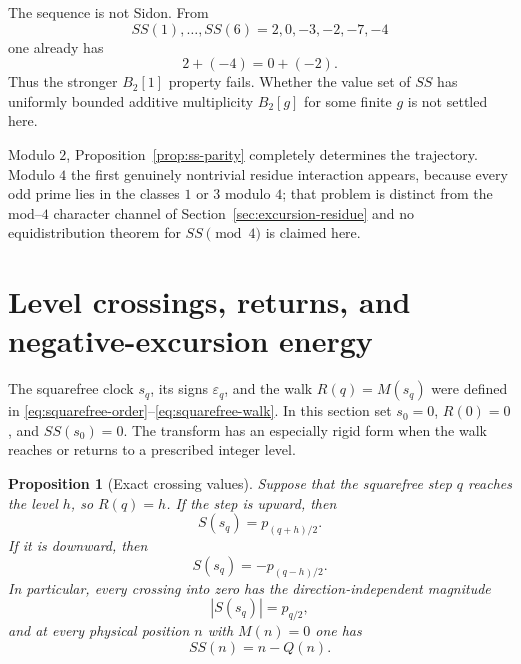 \documentclass[11pt]{amsart}
\numberwithin{equation}{section}
\theoremstyle{plain}
\newtheorem{proposition}[theorem]{Proposition}
\theoremstyle{definition}
\theoremstyle{remark}
\begin{document}
The sequence is not Sidon.  From
\begin{equation}
\label{eq:first-SS-values-v9}
SS(1),\ldots,SS(6)=2,0,-3,-2,-7,-4
\end{equation}
one already has
\begin{equation}
\label{eq:ss-not-Sidon-witness}
2+(-4)=0+(-2).
\end{equation}
Thus the stronger $B_2[1]$ property fails.  Whether the value set of $SS$ has
uniformly bounded additive multiplicity $B_2[g]$ for some finite $g$ is not
settled here.

Modulo $2$, Proposition~\ref{prop:ss-parity} completely determines the
trajectory.  Modulo $4$ the first genuinely nontrivial residue interaction
appears, because every odd prime lies in the classes $1$ or $3$ modulo $4$;
that problem is distinct from the mod--$4$ character channel of
Section~\ref{sec:excursion-residue} and no equidistribution theorem for
$SS\pmod4$ is claimed here.

\section{Level crossings, returns, and negative-excursion energy}
\label{sec:level-return-energy}

The squarefree clock $s_q$, its signs $\varepsilon_q$, and the walk
$R(q)=M(s_q)$ were defined in \eqref{eq:squarefree-order}--\eqref{eq:squarefree-walk}.
In this section set $s_0=0$, $R(0)=0$, and $SS(s_0)=0$.
The transform has an especially rigid form when the walk reaches or returns to
a prescribed integer level.

\begin{proposition}[Exact crossing values]
\label{prop:crossing-values}
Suppose that the squarefree step $q$ reaches the level $h$, so
$R(q)=h$.  If the step is upward, then
\begin{equation}
\label{eq:upward-crossing-value}
S(s_q)=p_{(q+h)/2}.
\end{equation}
If it is downward, then
\begin{equation}
\label{eq:downward-crossing-value}
S(s_q)=-p_{(q-h)/2}.
\end{equation}
In particular, every crossing into zero has the direction-independent
magnitude
\begin{equation}
\label{eq:zero-crossing-value}
|S(s_q)|=p_{q/2},
\end{equation}
and at every physical position $n$ with $M(n)=0$ one has
\begin{equation}
\label{eq:ss-on-zero-level}
SS(n)=n-Q(n).
\end{equation}
\end{proposition}
\end{document}
